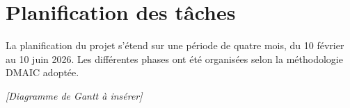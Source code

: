 \section{Planification des tâches}

La planification du projet s'étend sur une période de quatre mois, du 10 février au 10 juin 2026. Les différentes phases ont été organisées selon la méthodologie DMAIC adoptée.

\begin{center}
    \textit{[Diagramme de Gantt à insérer]}
\end{center}